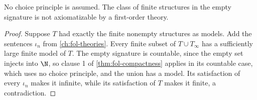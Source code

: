 \begin{corollary}
No choice principle is assumed.
The class of finite structures in the empty signature is not axiomatizable by
a first-order theory.
\end{corollary}
\begin{proof}
Suppose \(T\) had exactly the finite nonempty structures as models.  Add the
sentences \(\iota_n\) from \cref{ch:fol-theories}.  Every finite subset of
\(T\cup T_\infty\) has a sufficiently large finite model of \(T\).  The empty signature
is countable, since the empty set injects into \(\N\), so clause 1 of
\cref{thm:fol-compactness} applies in its countable case, which uses no
choice principle, and the union has a model.  Its satisfaction of every \(\iota_n\)
makes it infinite, while its satisfaction of \(T\) makes it finite, a
contradiction.
\end{proof}

